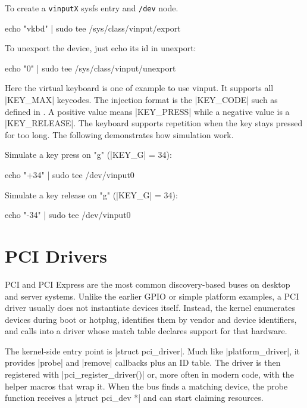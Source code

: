 \documentclass[10pt, oneside]{book}
\begin{document}
To create a \verb|vinputX| sysfs entry and \verb|/dev| node.

\begin{codebash}
echo "vkbd" | sudo tee /sys/class/vinput/export
\end{codebash}

To unexport the device, just echo its id in unexport:

\begin{codebash}
echo "0" | sudo tee /sys/class/vinput/unexport
\end{codebash}


Here the virtual keyboard is one of example to use vinput.
It supports all \cpp|KEY_MAX| keycodes.
The injection format is the \cpp|KEY_CODE| such as defined in .
A positive value means \cpp|KEY_PRESS| while a negative value is a \cpp|KEY_RELEASE|.
The keyboard supports repetition when the key stays pressed for too long.
The following demonstrates how simulation work.

Simulate a key press on "g" (\cpp|KEY_G| = 34):

\begin{codebash}
echo "+34" | sudo tee /dev/vinput0
\end{codebash}

Simulate a key release on "g" (\cpp|KEY_G| = 34):

\begin{codebash}
echo "-34" | sudo tee /dev/vinput0
\end{codebash}



\section{PCI Drivers}
\label{sec:pci}
PCI and PCI Express are the most common discovery-based buses on desktop and
server systems.
Unlike the earlier GPIO or simple platform examples, a PCI driver usually does
not instantiate devices itself.
Instead, the kernel enumerates devices during boot or hotplug, identifies them
by vendor and device identifiers, and calls into a driver whose match table
declares support for that hardware.

The kernel-side entry point is \cpp|struct pci_driver|.
Much like \cpp|platform_driver|, it provides \cpp|probe| and \cpp|remove|
callbacks plus an ID table.
The driver is then registered with \cpp|pci_register_driver()| or, more often
in modern code, with the helper macros that wrap it.
When the bus finds a matching device, the probe function receives a
\cpp|struct pci_dev *| and can start claiming resources.
\end{document}
